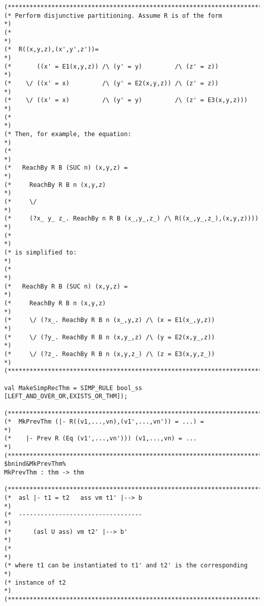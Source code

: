 \documentclass[12pt]{article}
\begin{document}
\begin{footnotesize}
\begin{Verbatim}[commandchars=\$\&\%]
(*****************************************************************************)
(* Perform disjunctive partitioning. Assume R is of the form                 *)
(*                                                                           *)
(*  R((x,y,z),(x',y',z'))=                                                   *)
(*       ((x' = E1(x,y,z)) /\ (y' = y)         /\ (z' = z))                  *)
(*    \/ ((x' = x)         /\ (y' = E2(x,y,z)) /\ (z' = z))                  *)
(*    \/ ((x' = x)         /\ (y' = y)         /\ (z' = E3(x,y,z)))          *)
(*                                                                           *)
(* Then, for example, the equation:                                          *)
(*                                                                           *)
(*   ReachBy R B (SUC n) (x,y,z) =                                           *)
(*     ReachBy R B n (x,y,z)                                                 *)
(*     \/                                                                    *)
(*     (?x_ y_ z_. ReachBy n R B (x_,y_,z_) /\ R((x_,y_,z_),(x,y,z))))       *)
(*                                                                           *)
(* is simplified to:                                                         *)
(*                                                                           *)
(*   ReachBy R B (SUC n) (x,y,z) =                                           *)
(*     ReachBy R B n (x,y,z)                                                 *)
(*     \/ (?x_. ReachBy R B n (x_,y,z) /\ (x = E1(x_,y,z))                   *)
(*     \/ (?y_. ReachBy R B n (x,y_,z) /\ (y = E2(x,y_,z))                   *)
(*     \/ (?z_. ReachBy R B n (x,y,z_) /\ (z = E3(x,y,z_))                   *)
(*****************************************************************************)

val MakeSimpRecThm = SIMP_RULE bool_ss [LEFT_AND_OVER_OR,EXISTS_OR_THM]);

(*****************************************************************************)
(*  MkPrevThm (|- R((v1,...,vn),(v1',...,vn')) = ...) =                      *)
(*    |- Prev R (Eq (v1',...,vn'))) (v1,...,vn) = ...                        *)
(*****************************************************************************)
$bnind&MkPrevThm%
MkPrevThm : thm -> thm

(*****************************************************************************)
(*  asl |- t1 = t2   ass vm t1' |--> b                                       *)
(*  ----------------------------------                                       *)
(*      (asl U ass) vm t2' |--> b'                                           *)
(*                                                                           *)
(* where t1 can be instantiated to t1' and t2' is the corresponding          *)
(* instance of t2                                                            *)
(*****************************************************************************)


\end{Verbatim}
\end{footnotesize}
\end{document}
